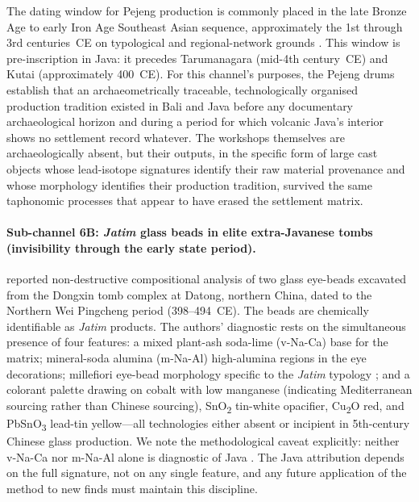 \documentclass[12pt,a4paper]{article}
\begin{document}
The dating window for Pejeng production is commonly placed in the late Bronze Age to early Iron Age Southeast Asian sequence, approximately the 1st through 3rd centuries~CE on typological and regional-network grounds \citep{bernetkempers1988,calo2014}. This window is pre-inscription in Java: it precedes Tarumanagara (mid-4th century~CE) and Kutai (approximately 400~CE). For this channel's purposes, the Pejeng drums establish that an archaeometrically traceable, technologically organised production tradition existed in Bali and Java before any documentary archaeological horizon and during a period for which volcanic Java's interior shows no settlement record whatever. The workshops themselves are archaeologically absent, but their outputs, in the specific form of large cast objects whose lead-isotope signatures identify their raw material provenance and whose morphology identifies their production tradition, survived the same taphonomic processes that appear to have erased the settlement matrix.

\paragraph{Sub-channel 6B: \textit{Jatim} glass beads in elite extra-Javanese tombs (invisibility through the early state period).} \citet{jia_etal_2024} reported non-destructive compositional analysis of two glass eye-beads excavated from the Dongxin tomb complex at Datong, northern China, dated to the Northern Wei Pingcheng period (398--494~CE). The beads are chemically identifiable as \textit{Jatim} products. The authors' diagnostic rests on the simultaneous presence of four features: a mixed plant-ash soda-lime (v-Na-Ca) base for the matrix; mineral-soda alumina (m-Na-Al) high-alumina regions in the eye decorations; millefiori eye-bead morphology specific to the \textit{Jatim} typology \citep{lankton2008}; and a colorant palette drawing on cobalt with low manganese (indicating Mediterranean sourcing rather than Chinese sourcing), SnO\textsubscript{2} tin-white opacifier, Cu\textsubscript{2}O red, and PbSnO\textsubscript{3} lead-tin yellow---all technologies either absent or incipient in 5th-century Chinese glass production. We note the methodological caveat explicitly: neither v-Na-Ca nor m-Na-Al alone is diagnostic of Java \citep{jia_etal_2025,wang_etal_2023}. The Java attribution depends on the full signature, not on any single feature, and any future application of the method to new finds must maintain this discipline.
\end{document}
